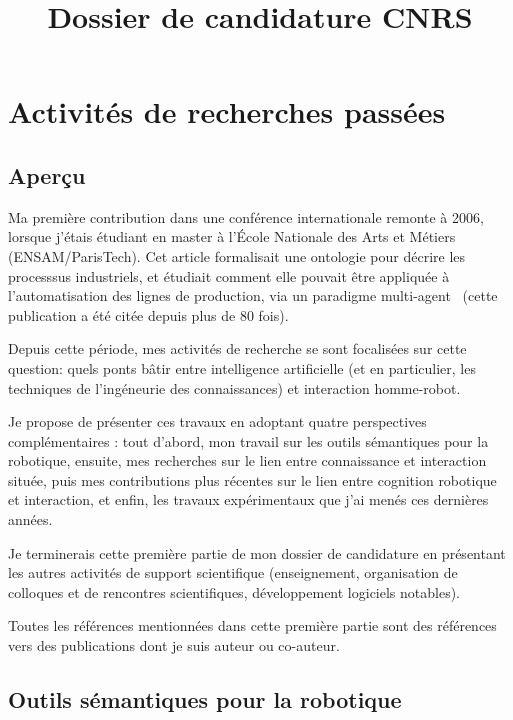 \documentclass[a4paper]{article}
\title{Dossier de candidature CNRS}
\author{}
\date{}
\begin{document}
\maketitle

\section{Activités de recherches passées}
\newrefsection

\subsection{Aperçu}
\label{apercu}

Ma première contribution dans une conférence internationale remonte à 2006,
lorsque j'étais étudiant en master à l'École Nationale des Arts et Métiers
(ENSAM/ParisTech). Cet article formalisait une ontologie pour décrire les
processsus industriels, et étudiait comment elle pouvait être appliquée à
l'automatisation des lignes de production, via un paradigme
multi-agent~\cite{lemaignan2006mason} (cette publication a été citée depuis
plus de 80 fois).

Depuis cette période, mes activités de recherche se sont focalisées sur cette
question: quels ponts bâtir entre intelligence artificielle (et en particulier,
les techniques de l'ingéneurie des connaissances) et interaction homme-robot.

Je propose de présenter ces travaux en adoptant quatre perspectives
complémentaires : tout d'abord, mon travail sur les outils sémantiques pour la
robotique, ensuite, mes recherches sur le lien entre connaissance et
interaction située, puis mes contributions plus récentes sur le lien entre
cognition robotique et interaction, et enfin, les travaux expérimentaux que
j'ai menés ces dernières années.

Je terminerais cette première partie de mon dossier de candidature en
présentant les autres activités de support scientifique (enseignement,
organisation de colloques et de rencontres scientifiques, développement
logiciels notables).

Toutes les références mentionnées dans cette première partie sont des références
vers des publications dont je suis auteur ou co-auteur.

\subsection{Outils sémantiques pour la robotique%
  \label{semantic-tools-for-robotics}%
}
\end{document}
